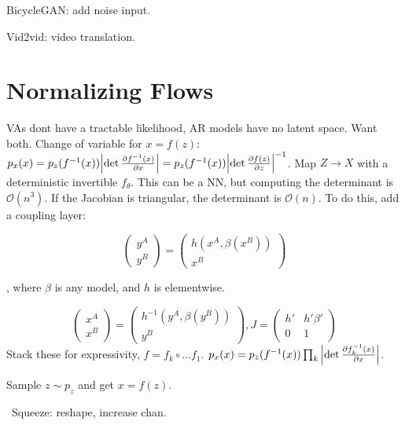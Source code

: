 \documentclass[11pt,landscape,a4paper,fleqn]{article}
\begin{document}
\begin{multicols*}{4}
BicycleGAN: add noise input.

Vid2vid: video translation.

\section{Normalizing Flows}

VAs dont have a tractable likelihood, AR models have no latent space.
Want both.
Change of variable for $x = f(z)$:
$p_x(x) = p_z(f^{-1}(x)) \abs{\det \pdv{f^{-1}(x)}{x}} = p_z(f^{-1}(x)) \abs{\det \pdv{f(z)}{z}}^{-1}$.
Map $Z \to X$ with a deterministic invertible $f_\theta$.
This can be a NN, but computing the determinant is $\mathcal{O}(n^3)$.
If the Jacobian is triangular, the determinant is $\mathcal{O}(n)$.
To do this, add a coupling layer:
\begin{minipage}{0.5\linewidth}
    \[\begin{pmatrix}
        y^A \\
        y^B
    \end{pmatrix} = \begin{pmatrix}
        h(x^A, \beta(x^B)) \\
        x^B
    \end{pmatrix}\]
\end{minipage}%
\hspace{0.3cm}%
\begin{minipage}{0.45\linewidth}
    , where $\beta$ is any model, and $h$ is elementwise.
\end{minipage}
\[\begin{pmatrix}
    x^A \\
    x^B
\end{pmatrix} = \begin{pmatrix}
    h^{-1}(y^A, \beta(y^B)) \\
    y^B
\end{pmatrix}, J = \begin{pmatrix}
    h' & h'\beta' \\
    0 & 1
\end{pmatrix}\]
Stack these for expressivity, $f = f_k \circ \dots f_1$.
$p_x(x) = p_z(f^{-1}(x)) \prod_k \abs{\det \pdv{f_k^{-1}(x)}{x}}$.

Sample $z \sim p_z$ and get $x = f(z)$.



\begin{wrapfigure}{R}{0.2\linewidth}
    
\end{wrapfigure}
\textbullet\ Squeeze: reshape, increase chan.


\end{multicols*}
\end{document}
